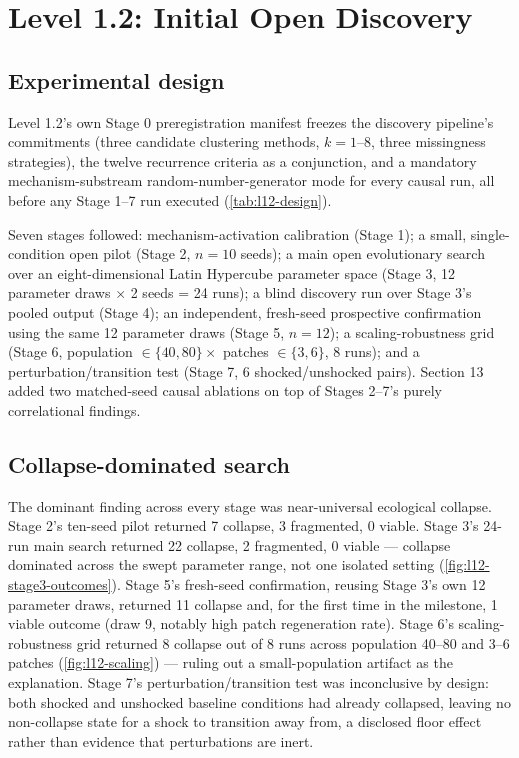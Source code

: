 \section{Level 1.2: Initial Open Discovery}
\label{sec:level12}

\subsection{Experimental design}
\label{sec:level12-design}

Level 1.2's own Stage 0 preregistration manifest freezes the discovery
pipeline's commitments (three candidate clustering methods, $k=1$--$8$,
three missingness strategies), the twelve recurrence criteria as a
conjunction, and a mandatory mechanism-substream random-number-generator
mode for every causal run, all before any Stage 1--7 run executed
(\cref{tab:l12-design}).

\begin{table}[htbp]
\centering
\caption{Level 1.2 experimental design by stage.}
\label{tab:l12-design}
\end{table}

Seven stages followed: mechanism-activation
calibration (Stage 1); a small, single-condition open pilot (Stage 2, $n=10$
seeds); a main open evolutionary search over an eight-dimensional Latin
Hypercube parameter space (Stage 3, 12 parameter draws $\times$ 2 seeds =
24 runs); a blind discovery run over Stage 3's pooled output (Stage 4); an
independent, fresh-seed prospective confirmation using the same 12
parameter draws (Stage 5, $n=12$); a scaling-robustness grid (Stage 6,
population $\in\{40,80\}\times$ patches $\in\{3,6\}$, 8 runs); and a
perturbation/transition test (Stage 7, 6 shocked/unshocked pairs). Section
13 added two matched-seed causal ablations on top of Stages 2--7's purely
correlational findings.

\subsection{Collapse-dominated search}
\label{sec:level12-collapse}

The dominant finding across every stage was near-universal ecological
collapse. Stage 2's ten-seed pilot returned 7 collapse, 3 fragmented, 0
viable. Stage 3's 24-run main search returned 22 collapse, 2 fragmented, 0
viable --- collapse dominated across the swept parameter range, not one
isolated setting (\cref{fig:l12-stage3-outcomes}). Stage 5's fresh-seed
confirmation, reusing Stage 3's own 12 parameter draws, returned 11
collapse and, for the first time in the milestone, 1 viable outcome (draw
9, notably high patch regeneration rate). Stage 6's scaling-robustness
grid returned 8 collapse out of 8 runs across population 40--80 and
3--6 patches (\cref{fig:l12-scaling}) --- ruling out a small-population
artifact as the explanation. Stage 7's perturbation/transition test was
inconclusive by design: both shocked and unshocked baseline conditions had
already collapsed, leaving no non-collapse state for a shock to transition
away from, a disclosed floor effect rather than evidence that
perturbations are inert.

